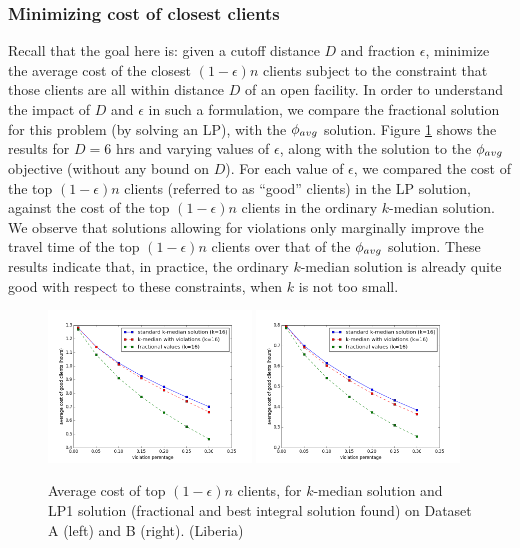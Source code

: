 \subsubsection*{Minimizing cost of closest clients}
Recall that the goal here is:
given a cutoff distance $D$ and fraction $\epsilon$, minimize the average cost of the 
closest $(1-\epsilon)n$ clients subject to the constraint that those clients are all 
within distance $D$ of an open facility. 
In order to understand the impact of $D$ and $\epsilon$ in such a formulation, we compare the
fractional solution for this problem (by solving an LP), with the $\phi_{avg}$ solution.
Figure \ref{fig:kmed_vs_LP1} shows the results for $D=6$ hrs and varying 
values of $\epsilon$, along with the solution to the $\phi_{avg}$ objective (without any bound on $D$). 
For each value of $\epsilon$, we compared the cost of the top $(1-\epsilon)n$ clients 
(referred to as ``good'' clients) in the LP solution, against the cost of the top $(1-\epsilon)n$ 
clients in the ordinary $k$-median solution.
We observe that solutions allowing for violations only marginally 
improve the travel time of the top $(1-\epsilon)n$ clients over that of the $\phi_{avg}$ solution.
These results indicate that, in practice, the ordinary $k$-median solution is already quite good with respect to 
these constraints, when $k$ is not too small.


\begin{figure}[h]
  \centering %
	\includegraphics[width=0.48\textwidth]{figs/plotA16_violation.png}
	\includegraphics[width=0.48\textwidth]{figs/plotB16_violation.png}
\caption{Average cost of top $(1-\epsilon)n$ clients, for $k$-median solution and LP1 solution (fractional and best integral solution found) on Dataset A (left) and B (right). (Liberia)} 
	\label{fig:kmed_vs_LP1}
\end{figure}


